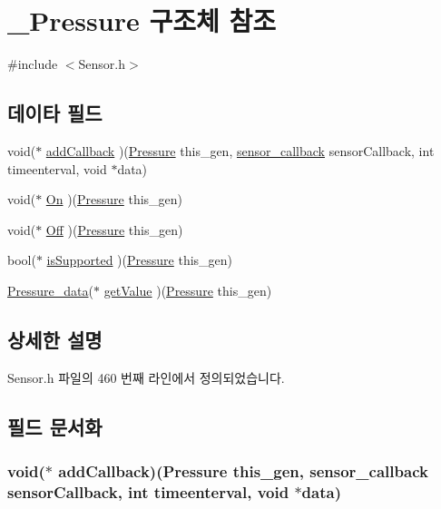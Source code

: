 \hypertarget{struct___pressure}{\section{\-\_\-\-Pressure 구조체 참조}
\label{struct___pressure}
}


{\ttfamily \#include $<$Sensor.\-h$>$}

\subsection*{데이타 필드}
\begin{DoxyCompactItemize}
\item 
void($\ast$ \hyperlink{struct___pressure_ac3f91ac03d8998c52bcc571a0c88f865}{add\-Callback} )(\hyperlink{_sensor_8h_a2365e53ab6f346814862c92c2c207e7a}{Pressure} this\-\_\-gen, \hyperlink{_sensor_8h_ad8114207845fc5e0aa30832f0c718cd6}{sensor\-\_\-callback} sensor\-Callback, int timeenterval, void $\ast$data)
\item 
void($\ast$ \hyperlink{struct___pressure_a0488fe48cd57a659686387d613cb257c}{On} )(\hyperlink{_sensor_8h_a2365e53ab6f346814862c92c2c207e7a}{Pressure} this\-\_\-gen)
\item 
void($\ast$ \hyperlink{struct___pressure_adf5840cfc7760f9f71bcbffceef22fa5}{Off} )(\hyperlink{_sensor_8h_a2365e53ab6f346814862c92c2c207e7a}{Pressure} this\-\_\-gen)
\item 
bool($\ast$ \hyperlink{struct___pressure_af2099f6f9efc1f7213acfd420ea7b8c6}{is\-Supported} )(\hyperlink{_sensor_8h_a2365e53ab6f346814862c92c2c207e7a}{Pressure} this\-\_\-gen)
\item 
\hyperlink{_sensor_8h_aa9f86b0945dd3aa53269e0a120cce2b0}{Pressure\-\_\-data}($\ast$ \hyperlink{struct___pressure_a9739a7d1b596639f720e0fbb2dd8f064}{get\-Value} )(\hyperlink{_sensor_8h_a2365e53ab6f346814862c92c2c207e7a}{Pressure} this\-\_\-gen)
\end{DoxyCompactItemize}


\subsection{상세한 설명}


Sensor.\-h 파일의 460 번째 라인에서 정의되었습니다.



\subsection{필드 문서화}
\hypertarget{struct___pressure_ac3f91ac03d8998c52bcc571a0c88f865}{
\subsubsection[{add\-Callback}]{\setlength{\rightskip}{0pt plus 5cm}void($\ast$  add\-Callback)({\bf Pressure} this\-\_\-gen, {\bf sensor\-\_\-callback} sensor\-Callback, int timeenterval, void $\ast$data)}}\label{struct___pressure_ac3f91ac03d8998c52bcc571a0c88f865}


